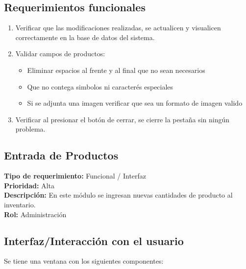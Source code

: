 \documentclass[a4paper,DIV=12]{scrreprt}
\begin{document}
\subsection*{Requerimientos funcionales}
\begin{enumerate}
	\item{Verificar que las modificaciones realizadas, se actualicen y visualicen correctamente en la base de datos del sistema.}
	\item{Validar campos de productos:}
	\begin{itemize}
		\item {Eliminar espacios al frente y al final que no sean necesarios}
		\item {Que no contega simbolos ni caracterés especiales}
		\item {Si se adjunta una imagen verificar que sea un formato de imagen valido}
	\end{itemize}
    \item{Verificar al presionar el botón de cerrar, se cierre la pestaña sin ningún problema.}
\end{enumerate}

\newpage
\setcounter{subsection}{-1}
\setcounter{chapter}{1}
\setcounter{section}{4}
\subsection{Entrada de Productos}
\noindent
\textbf{Tipo de requerimiento:} Funcional / Interfaz\\
\textbf{Prioridad:} Alta\\
\textbf{Descripción:} En este módulo se ingresan nuevas cantidades de producto al inventario.\\
\textbf{Rol:} Administración\\
\subsection*{Interfaz/Interacción con el usuario}
Se tiene una ventana con los siguientes componentes: 
\end{document}
